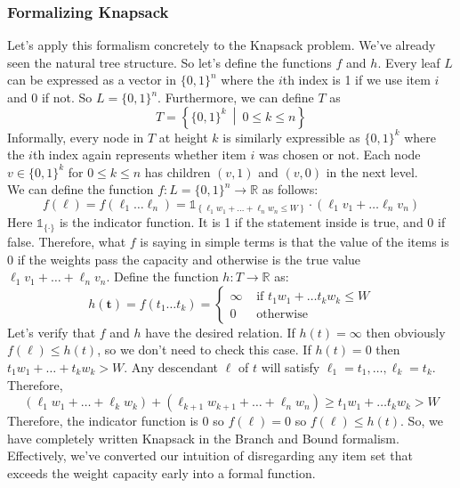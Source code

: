 \documentclass[11pt]{article}
\theoremstyle{plain}
\theoremstyle{definition}
\newcommand{\RR}{\mathbb{R}}
\numberwithin{equation}{section}
\numberwithin{figure}{section}
\begin{document}
\subsubsection{Formalizing Knapsack}
Let's apply this formalism concretely to the Knapsack problem. We've already seen the natural tree structure. So let's define the functions $f$ and $h$. Every leaf $L$ can be expressed as a vector in $\{0,1\}^n$ where the $i$th index is 1 if we use item $i$ and $0$ if not. So $L = \{0, 1\}^n$. Furthermore, we can define $T$ as
\begin{equation}
T = \left \{ \{0,1\}^k \ \middle \vert \ 0 \leq k \leq n \right\}
\end{equation}
Informally, every node in $T$ at height $k$ is similarly expressible as $\{0, 1\}^k$ where the $i$th index again represents whether item $i$ was chosen or not. Each node $v \in \{0, 1\}^k$ for $0 \leq k \leq n$ has children $(v, 1)$ and $(v,0)$ in the next level. \\

\noindent We can define the function $f : L = \{0,1\}^n \rightarrow \RR$ as follows:
\begin{equation}
f(\mathbf{\ell}) = f(\ell_1 \ldots \ell_n) = \mathds{1}_{\displaystyle \left\{ \ell_1 w_1 + \ldots + \ell_n w_n \leq W \right \}} \cdot \left( \ell_1 v_1 + \ldots \ell_n v_n \right)
\end{equation}
Here $\mathds{1}_{\{\cdot\}}$ is the indicator function. It is 1 if the statement inside is true, and 0 if false. Therefore, what $f$ is saying in simple terms is that the value of the items is $0$ if the weights pass the capacity and otherwise is the true value $\ell_1 v_1 + \ldots + \ell_n v_n$. Define the function $h: T \rightarrow \RR$ as:
\begin{equation}
h(\mathbf{t}) = f(t_1 \ldots t_k) = \begin{cases} \infty & \text{ if } t_1 w_1 + \ldots t_k w_k \leq W \\ 0 & \text{ otherwise } \end{cases}
\end{equation}
Let's verify that $f$ and $h$ have the desired relation. If $h(t) = \infty$ then obviously $f(\ell) \leq h(t)$, so we don't need to check this case. If $h(t) = 0$ then $t_1 w_1 + \ldots + t_k w_k > W$. Any descendant $\ell$ of $t$ will satisfy $\ell_1 = t_1, \ldots, \ell_k = t_k$. Therefore,
\begin{equation}
(\ell_1 w_1 + \ldots + \ell_k w_k) + (\ell_{k+1} w_{k+1} + \ldots + \ell_n w_n) \geq t_1 w_1 + \ldots t_k w_k > W
\end{equation}
Therefore, the indicator function is $0$ so $f(\ell) = 0$ so $f(\ell) \leq h(t)$. So, we have completely written Knapsack in the Branch and Bound formalism. Effectively, we've converted our intuition of disregarding any item set that exceeds the weight capacity early into a formal function. 
\end{document}
